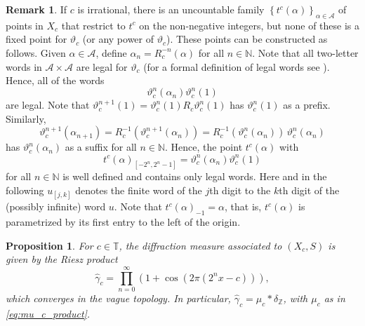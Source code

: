 \documentclass[11pt,reqno]{amsart}
\theoremstyle{plain}
\newtheorem{prop}[theorem]{Proposition}
\theoremstyle{definition}
\newtheorem{remark}[theorem]{Remark}
\newcommand{\Z}{{\mathbb Z}}
\newcommand{\N}{{\mathbb N}}
\newcommand{\T}{{\mathbb T}}
\newcommand{\mc}{\mathcal}
\begin{document}
\begin{remark}
If $c$ is irrational, there is an uncountable family $\left\{t^c(\alpha)\right\}_{\alpha \in  \mc A}$ of points in $X_c$ that restrict to $t^c$ on the non-negative integers, but none of these is a fixed point for $\vartheta_c$ (or any power of $\vartheta_c$). 
These points can be constructed as follows. Given $\alpha \in \mc A$, define $\alpha_n = R_c^{-n}(\alpha)$ for all $n \in \N$. Note that all two-letter words in $\mc A \times \mc A$ are legal for $\vartheta_c$ (for a formal definition of legal words see \cite{MRW}). Hence, all of the words
\[
\vartheta_c^n(\alpha_n) \vartheta_c^n(1)
\] 
are legal. Note that $\vartheta_c^{n+1}(1) = \vartheta_c^n(1) R_c \vartheta_c^n(1)$ has $\vartheta_c^n(1)$ as a prefix. Similarly,
\[
 \vartheta_c^{n+1}(\alpha_{n+1}) = R_c^{-1}( \vartheta_c^{n+1}(\alpha_n)) = R_c^{-1} ( \vartheta_c^n(\alpha_n)) \,  \vartheta_c^n(\alpha_n)
\]
has $\vartheta_c^n(\alpha_n)$ as a suffix for all $n \in \N$. Hence, the point $t^c(\alpha)$ with 
\[
t^c(\alpha)_{[-2^n, 2^n-1]} = \vartheta_c^n(\alpha_n)  \vartheta_c^n(1)
\]
for all $n \in \N$ is well defined and contains only legal words.
Here and in the following $u_{[j,k]}$ denotes the finite word of the $j$th digit to the $k$th digit of the (possibly infinite) word $u$.
Note that $t^c(\alpha)_{-1} = \alpha$, that is, $t^c(\alpha)$ is parametrized by its first entry to the left of the origin.
\end{remark}




\begin{prop}
For $c\in \T$, the diffraction measure associated to $(X_{c},S)$ is given by the Riesz product
\begin{equation*}
\widehat{\gamma}_{c} = \prod_{n = 0}^{\infty} (1 + \cos(2\pi (2^n x - c))),%
\end{equation*}
which converges in the vague topology. In particular, $\widehat{\gamma}_{c} = \mu_c \ast \delta_\Z$, with $\mu_c$ as in \eqref{eq:mu_c_product}.
\end{prop}
\end{document}
